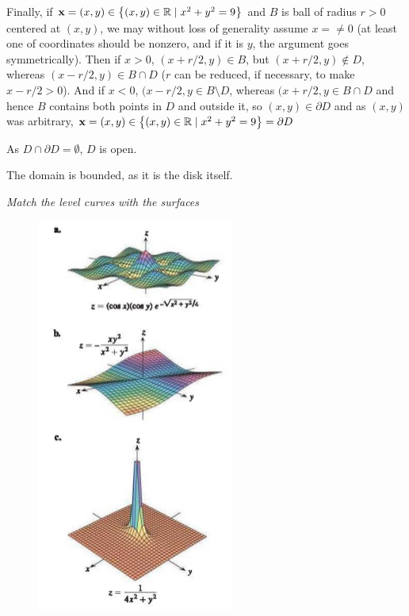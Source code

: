 \documentclass[8pt]{article} %
\begin{document}
\begin{description}
{			Finally, if $\mathbf{x}=(x,y)\in\left\{(x,y)\in\mathbb{R}\mid x^2+y^2=9\right\}$ and $B$ is ball of radius $r>0$ centered at $(x,y)$,
			we may without loss of generality assume $x=\neq 0$ (at least one of coordinates should be nonzero, and if it is $y$, the
			argument goes symmetrically). Then if $x>0$, $(x+r/2,y)\in B$, but $(x+r/2,y)\notin D$, whereas $(x-r/2,y)\in B\cap D$
			($r$ can be reduced, if necessary, to make $x-r/2>0$). And if $x<0$, $(x-r/2,y\in B\setminus D$, whereas $(x+r/2,y\in B\cap
			D$ and hence $B$ contains both points in $D$ and outside it, so $(x,y)\in\partial D$ and as $(x,y)$ was arbitrary, 
			$\mathbf{x}=(x,y)\in\left\{(x,y)\in\mathbb{R}\mid x^2+y^2=9\right\}=\partial D$
		\item As $D\cap \partial D=\emptyset$, $D$ is open.
		\item The domain is bounded, as it is the disk itself.
		}
	\item[\# 31-36.]{{\it Match the level curves}
		{\it with the surfaces}
		\begin{figure}[H]
		\centering
		\begin{minipage}{.6\textwidth}
		  \centering
		  \includegraphics[width=.5\linewidth]{surfaces1.png}
		\end{minipage}%
		\begin{minipage}{.6\textwidth}
		  \centering

\end{minipage}
\end{figure}}
\end{description}
\end{document}
